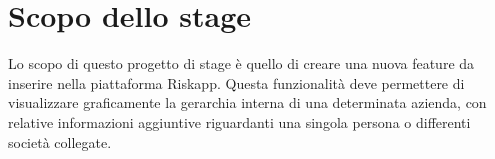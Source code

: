 \section*{Scopo dello stage}
Lo scopo di questo progetto di stage è quello di creare una nuova feature da inserire nella piattaforma Riskapp. Questa funzionalità deve permettere di visualizzare graficamente la gerarchia interna di una determinata azienda, con relative informazioni aggiuntive riguardanti una singola persona o differenti società collegate. 
